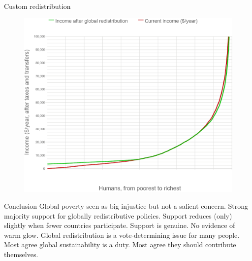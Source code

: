 \documentclass[aspectratio=169,xcolor=dvipsnames, 11pt,mathserif]{beamer}
\begin{document}
\begin{frame}{Custom redistribution \href{run:../figures/questionnaire/survey_custom_redistr.mp4}{} \href{https://bit.ly/custom_redistr}{}}
{\begin{figure}
    \includegraphics[height=.83\textheight]{../figures/questionnaire/survey_custom_redistr_median_zoom.png}\end{figure}}
\end{frame}

\begin{frame}{Conclusion}
\bbs
\ip Global poverty seen as big injustice but not a salient concern.
\ip Strong majority support for globally redistributive policies.
\ip Support reduces (only) slightly when fewer countries participate.
\ip Support is genuine. No evidence of warm glow.
\ip Global redistribution is a vote-determining issue for many people. %
\ip Most agree global sustainability is a duty.
\ip Most agree they should contribute themselves.
\ee
\end{frame}
\end{document}
